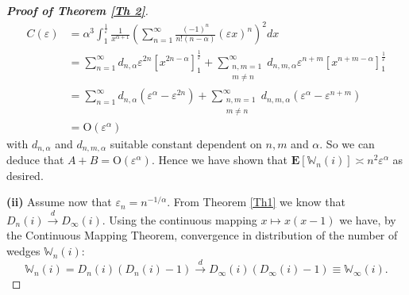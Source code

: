 \documentclass[11pt, reqno]{amsart}
\numberwithin{equation}{section}
\theoremstyle{plain} %
\theoremstyle{definition} %
\newcommand{\eps}{\varepsilon}
\begin{document}
\begin{proof}[{\bf Proof of Theorem \ref{Th 2}}]
{$$
\begin{aligned}
C(\eps)& =\alpha^3 \int_1^{\frac{1}{\varepsilon}} \frac{1}{x^{\alpha+1}}\left(\sum_{n=1}^{\infty} \frac{(-1)^n}{n!(n-\alpha)}(\varepsilon x)^n\right)^2 d x \\
& =\sum_{n=1}^{\infty} d_{n, \alpha} \varepsilon^{2 n}\left[x^{2 n-\alpha}\right]_1^{\frac{1}{\varepsilon}}+\sum_{\substack{n, m=1 \\
m \neq n}}^{\infty} d_{n, m, \alpha} \varepsilon^{n+m}\left[x^{n+m-\alpha}\right]_1^{\frac{1}{\varepsilon}} \\
& =\sum_{n=1}^{\infty} d_{n, \alpha}\left(\varepsilon^\alpha-\varepsilon^{2 n}\right)+\sum_{\substack{n, m=1 \\
m \neq n}}^{\infty} d_{n, m, \alpha}\left(\varepsilon^\alpha-\varepsilon^{n+m}\right) \\
& =\mathrm{O}\left(\varepsilon^\alpha\right)
\end{aligned}
$$
with $d_{n, \alpha}$ and $d_{n, m, \alpha}$ suitable constant dependent on $n, m$ and $\alpha$. So we can deduce that $A+B=\mathrm{O}\left(\varepsilon^\alpha\right)$. Hence we have shown that $\mathbf{E}\left[\mathbb{W}_n(i)\right] \asymp n^2 \eps^\alpha$ as desired.
}


{\bf (ii)} Assume now that $\eps_n= n^{-1/\alpha}$. From Theorem \ref{Th1} we know that $D_n(i)\overset{d}\longrightarrow D_{\infty}(i)$. Using the continuous mapping $x\mapsto x(x-1)$ we have, by the Continuous Mapping Theorem, convergence in distribution of the number of wedges $\mathbb{W}_n(i)$:
\begin{equation}
    \mathbb{W}_n(i) = D_n(i)(D_n(i) -1) \overset{d}\longrightarrow D_{\infty}(i)(D_{\infty}(i) -1) \equiv \mathbb{W}_{\infty}(i).
\end{equation}


\end{proof}
\end{document}

